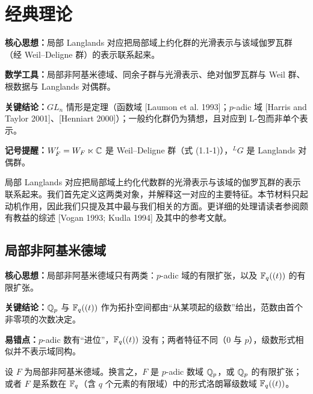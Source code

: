 \section{经典理论}

\begin{keypoints}
    \item \textbf{核心思想：}局部 Langlands 对应把局部域上约化群的光滑表示与该域伽罗瓦群（经 Weil--Deligne 群）的表示联系起来。
    \item \textbf{数学工具：}局部非阿基米德域、同余子群与光滑表示、绝对伽罗瓦群与 Weil 群、根数据与 Langlands 对偶群。
    \item \textbf{关键结论：}$GL_n$ 情形是定理（函数域 [Laumon et al. 1993]；$p$-adic 域 [Harris and Taylor 2001]、[Henniart 2000]）；一般约化群仍为猜想，且对应到 L-包而非单个表示。
    \item \textbf{记号提醒：}$W'_F=W_F\ltimes\mathbb{C}$ 是 Weil--Deligne 群（式 (1.1-1)），${}^L G$ 是 Langlands 对偶群。
\end{keypoints}

局部 Langlands 对应把局部域上约化代数群的光滑表示与该域的伽罗瓦群的表示联系起来。我们首先定义这两类对象，并解释这一对应的主要特征。本节材料只起动机作用，因此我们只提及其中最与我们相关的方面。更详细的处理请读者参阅颇有教益的综述 [Vogan 1993; Kudla 1994] 及其中的参考文献。

\subsection{局部非阿基米德域}

\begin{keypoints}
    \item \textbf{核心思想：}局部非阿基米德域只有两类：$p$-adic 域的有限扩张，以及 $\mathbb{F}_q((t))$ 的有限扩张。
    \item \textbf{关键结论：}$\mathbb{Q}_p$ 与 $\mathbb{F}_q((t))$ 作为拓扑空间都由“从某项起的级数”给出，范数由首个非零项的次数决定。
    \item \textbf{易错点：}$p$-adic 数有“进位”，$\mathbb{F}_q((t))$ 没有；两者特征不同（$0$ 与 $p$），级数形式相似并不表示域同构。
\end{keypoints}

设 $F$ 为局部非阿基米德域。换言之，$F$ 是 $p$-adic 数域 $\mathbb{Q}_p$，或 $\mathbb{Q}_p$ 的有限扩张；或者 $F$ 是系数在 $\mathbb{F}_q$（含 $q$ 个元素的有限域）中的形式洛朗幂级数域 $\mathbb{F}_q((t))$。

